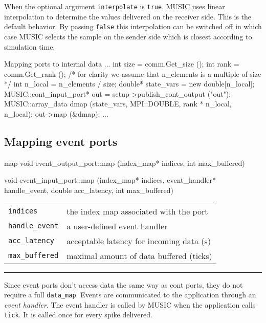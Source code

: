 \documentclass[a4paper,twoside]{report}
\makeatletter
\newenvironment{parameters}%
{\begin{tabular}{@{\hspace{2em}}lp{0.6\textwidth}}}%
{\end{tabular}\par\vspace{1mm}\par\hrule\par\vspace{5mm}}
\makeatother
\begin{document}
When the optional argument \lstinline|interpolate| is
\lstinline|true|, MUSIC uses linear interpolation to determine the
values delivered on the receiver side.  This is the default behavior.
By passing \lstinline|false| this interpolation can be switched off in
which case MUSIC selects the sample on the sender side which is
closest according to simulation time.



\begin{code}{Mapping ports to internal data\label{code:mapping}}
{
  ...
  int size = comm.Get_size ();
  int rank = comm.Get_rank ();
  /* for clarity we assume that n_elements
     is a multiple of size */
  int n_local = n_elements / size;
  double* state_vars = new double[n_local];
  MUSIC::cont_input_port* out =
     setup->publish_cont_output ("out");
  MUSIC::array_data dmap (state_vars, MPI::DOUBLE,
                          rank * n_local, n_local);
  out->map (&dmap);
  ...
}
\end{code}


\subsection{Mapping event ports}

\begin{head}{map}
  void event_output_port::map (index_map* indices,
                               int max_buffered)

  void event_input_port::map (index_map* indices,
                              event_handler* handle_event,
                              double acc_latency,
                              int max_buffered)
\end{head}
\begin{parameters}
  \lstinline|indices| & the index map associated with the port \\
  \lstinline|handle_event| & a user-defined event handler \\
  \lstinline|acc_latency| & acceptable latency for incoming data (s) \\
  \lstinline|max_buffered| & maximal amount of data buffered (ticks) \\
\end{parameters}

Since event ports don't access data the same way as cont ports, they
do not require a full \lstinline|data_map|.  Events are communicated
to the application through an \emph{event handler}.  The event handler is called by MUSIC when the application
calls \lstinline|tick|.  It is called once for every spike delivered.
\end{document}
